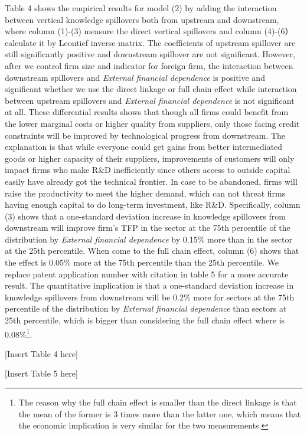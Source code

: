 \documentclass[12pt]{article}%
\begin{document}
\begin{CJK*}{GBK}{fs}
\par  Table 4 shows the empirical results for model (2) by adding the interaction between vertical knowledge spillovers both from upstream and downstream, where column (1)-(3) measure the direct vertical spillovers and column (4)-(6） calculate it by Leontief inverse matrix. The coefficients of upstream spillover are still significantly positive and downstream spillover are not significant. However, after we control firm size and indicator for foreign firm, the interaction between downstream spillovers and \emph{External financial dependence} is positive and significant whether we use the direct linkage or full chain effect while interaction between upstream spillovers and \emph{External financial dependence} is not significant at all. These differential results shows that though all firms could benefit from the lower marginal costs or higher quality from suppliers, only those facing credit constraints will be improved by technological progress from downstream. The explanation is that while everyone could get gains from better intermediated goods or higher capacity of their suppliers, improvements of customers will only impact firms who make R\&D inefficiently since others access to outside capital easily have already got the technical frontier. In case to be abandoned, firms will raise the productivity to meet the higher demand, which can not threat firms having enough capital to do long-term investment, like R\&D. Specifically, column (3) shows that a one-standard deviation increase in knowledge spillovers from downstream will improve firm's TFP in the sector at the 75th percentile of the distribution by \emph{External financial dependence} by 0.15\% more than in the sector at the 25th percentile. When come to the full chain effect, column (6) shows that the effect is 0.05\% more at the 75th percentile than the 25th percentile. We replace patent application number with citation in table 5 for a more accurate result. The quantitative implication is that a one-standard deviation increase in knowledge spillovers from downstream will be 0.2\% more for sectors at the 75th percentile of the distribution by \emph{External financial dependence} than sectors at 25th percentile, which is bigger than considering the full chain effect where is 0.08\%\footnote{\scriptsize The reason why the full chain effect is smaller than the direct linkage is that the mean of the former is 3 times more than the latter one, which means that the economic implication is very similar for the two measurements.}.
\begin{center}
  [Insert Table 4 here]
\end{center}
\begin{center}
  [Insert Table 5 here]
\end{center}




\end{CJK*}
\end{document}

